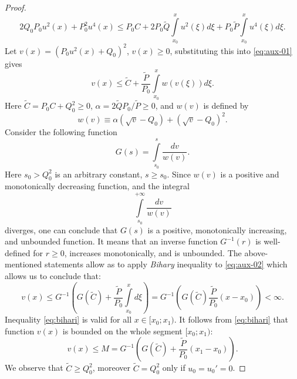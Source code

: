 \begin{proof}
	\begin{equation}
		2 Q_0 P_0 u^2(x) + P_0^2 u^4(x) \le P_0 C + 2 P_0 \widetilde{Q} \int \limits_{x_0}^{x} u^2(\xi) d\xi + P_0 \widetilde{P} \int \limits_{x_0}^{x} u^4(\xi) d\xi.
		\label{eq:aux-01}
	\end{equation}
	Let $v(x) = (P_0 u^2(x) + Q_0)^2$, $v(x) \ge 0$, substituting this into \eqref{eq:aux-01} gives
	\begin{equation}
		v(x) \le \widetilde{C} + \dfrac{\widetilde{P}}{P_0} \int \limits_{x_0}^{x} w(v(\xi)) d\xi.
		\label{eq:aux-02}
	\end{equation}
	Here $\widetilde{C} = P_0 C + Q_0^2 \ge 0$, $\alpha = 2 \widetilde{Q} P_0 / \widetilde{P} \ge 0$, and $w(v)$ is defined by
	\begin{equation}
		w(v) \equiv \alpha (\sqrt{v} - Q_0) + (\sqrt{v} - Q_0)^2.
	\end{equation}
	Consider the following function
	\begin{equation}
		G(s) = \int \limits_{s_0}^{s} \dfrac{dv}{w(v)}.
	\end{equation}
	Here $s_0 > Q_0^2$ is an arbitrary constant, $s \ge s_0$.
	Since $w(v)$ is a positive and monotonically decreasing function, and the integral
	\begin{equation}
		\int \limits_{s_0}^{+\infty} \dfrac{dv}{w(v)}
	\end{equation}
	diverges, one can conclude that $G(s)$ is a positive, monotonically increasing, and unbounded function.
	It means that an inverse function $G^{-1}(r)$ is well-defined for $r \ge 0$, increases monotonically, and is unbounded.
	The above-mentioned statements allow as to apply {\it Bihary} inequality \cite[theorem 2.3.1]{Pachpatte} to \eqref{eq:aux-02} which allows us to conclude that:
	\begin{equation}
		v(x) \le G^{-1} \left( G(\widetilde{C}) + \dfrac{\widetilde{P}}{P_0} \int \limits_{x_0}^{x} d\xi \right) = G^{-1} \left( G(\widetilde{C}) \dfrac{\widetilde{P}}{P_0} (x - x_0) \right) < \infty.
		\label{eq:bihari}
	\end{equation}
	Inequality \eqref{eq:bihari} is valid for all $x \in [x_0; x_1)$.
	It follows from \eqref{eq:bihari} that function $v(x)$ is bounded on the whole segment $[x_0; x_1)$:
	\begin{equation}
		v(x) \le M = G^{-1} \left( G(\widetilde{C}) + \dfrac{\widetilde{P}}{P_0} (x_1 - x_0) \right).
	\end{equation}
	We observe that $\widetilde{C} \ge Q_0^2$, moreover $\widetilde{C} = Q_0^2$ only if $u_0 = u_0' = 0$.

\end{proof}
